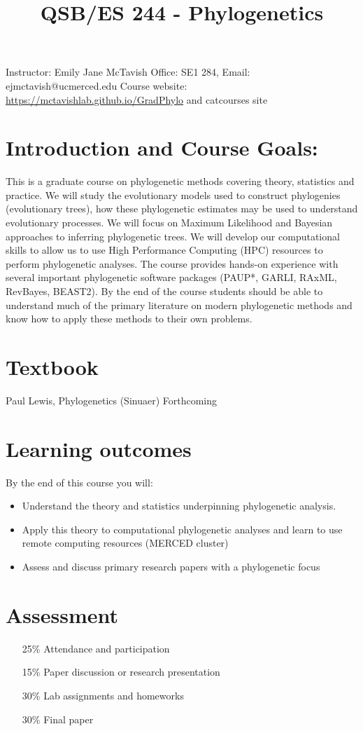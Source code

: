 \documentclass{article}
\title{QSB/ES 244 - Phylogenetics}
\begin{document}
\maketitle
Instructor: Emily Jane McTavish
Office: SE1 284, Email: ejmctavish@ucmerced.edu
Course website: \url{https://mctavishlab.github.io/GradPhylo}
and catcourses site

\section*{Introduction and Course Goals:}

This is a graduate course on phylogenetic methods covering theory, statistics and practice.
We will study the evolutionary models used to construct phylogenies (evolutionary trees), 
how these phylogenetic estimates may be used to understand evolutionary processes.
We will focus on Maximum Likelihood and Bayesian approaches to inferring phylogenetic trees.
We will develop our computational skills to allow us to use High Performance Computing (HPC) resources to 
perform phylogenetic analyses.
The course provides hands-on experience with several important phylogenetic software packages (PAUP*, GARLI, RAxML, RevBayes, BEAST2).
By the end of the course students should be able to understand much of the primary literature on modern phylogenetic methods and
know how to apply these methods to their own problems. 


\section*{Textbook}
Paul Lewis, Phylogenetics (Sinuaer) Forthcoming


\section*{Learning outcomes}

By the end of this course you will:
\begin{itemize}
 \item Understand the theory and statistics underpinning phylogenetic analysis.
 \item Apply this theory to computational phylogenetic analyses and learn to use remote computing resources (MERCED cluster)
 \item Assess and discuss primary research papers with a phylogenetic focus
\end{itemize}

\section*{Assessment}
\begin{itemize}
 \item[25\%] Attendance and participation
 \item[15\%] Paper discussion or research presentation
 \item[30\%] Lab assignments and homeworks
 \item[30\%] Final paper
\end{itemize}
\end{document}
